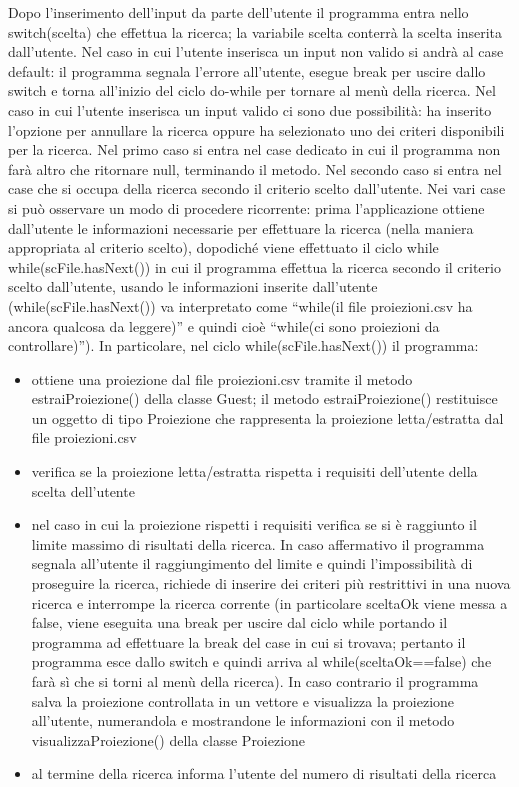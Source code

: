 \documentclass[a4paper,titlepage,openany,12pt]{book}
\begin{document}
Dopo l’inserimento dell’input da parte dell’utente il programma entra nello switch(scelta) che effettua la ricerca; la variabile scelta conterrà la scelta inserita dall’utente.
Nel caso in cui l’utente inserisca un input non valido si andrà al case default: il programma segnala l’errore all’utente, esegue break per uscire dallo switch e torna all’inizio del ciclo do-while per tornare al menù della ricerca.
Nel caso in cui l’utente inserisca un input valido ci sono due possibilità: ha inserito l’opzione per annullare la ricerca oppure ha selezionato uno dei criteri disponibili per la ricerca. Nel primo caso si entra nel case dedicato in cui il programma non farà altro che ritornare null, terminando il metodo. Nel secondo caso si entra nel case che si occupa della ricerca secondo il criterio scelto dall’utente.
Nei vari case si può osservare un modo di procedere ricorrente: prima l’applicazione ottiene dall’utente le informazioni necessarie per effettuare la ricerca (nella maniera appropriata al criterio scelto), dopodiché viene effettuato il ciclo while while(scFile.hasNext()) in cui il programma effettua la ricerca secondo il criterio scelto dall’utente, usando le informazioni inserite dall’utente (while(scFile.hasNext()) va interpretato come “while(il file proiezioni.csv ha ancora qualcosa da leggere)” e quindi cioè “while(ci sono proiezioni da controllare)”).
In particolare, nel ciclo while(scFile.hasNext()) il programma:

\begin{center}
\begin{varwidth}{\textwidth}
\begin{itemize}
\item[•] ottiene una proiezione dal file proiezioni.csv tramite il metodo estraiProiezione() della classe Guest; il metodo estraiProiezione() restituisce un oggetto di tipo Proiezione che rappresenta la proiezione letta/estratta dal file proiezioni.csv
\item[•] verifica se la proiezione letta/estratta rispetta i requisiti dell’utente della scelta dell’utente
\item[•] nel caso in cui la proiezione rispetti i requisiti verifica se si è raggiunto il limite massimo di risultati della ricerca. In caso affermativo il programma segnala all’utente il raggiungimento del limite e quindi l’impossibilità di proseguire la ricerca, richiede di inserire dei criteri più restrittivi in una nuova ricerca e interrompe la ricerca corrente (in particolare sceltaOk viene messa a false, viene eseguita una break per uscire dal ciclo while portando il programma ad effettuare la break del case in cui si trovava; pertanto il programma esce dallo switch e quindi arriva al while(sceltaOk==false) che farà sì che si torni al menù della ricerca). In caso contrario il programma salva la proiezione controllata in un vettore e visualizza la proiezione all’utente, numerandola e mostrandone le informazioni con il metodo visualizzaProiezione() della classe Proiezione
\item[•] al termine della ricerca informa l’utente del numero di risultati della ricerca
\end{itemize}
\end{varwidth}
\end{center}
\end{document}
